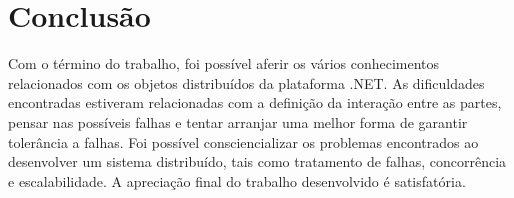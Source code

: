 \chapter{Conclusão} \label{conclusao}

Com o término do trabalho, foi possível aferir os vários conhecimentos relacionados com os objetos distribuídos da plataforma .NET.
As dificuldades encontradas estiveram relacionadas com a definição da interação entre as partes, pensar nas possíveis falhas e tentar arranjar uma melhor forma de garantir tolerância a falhas. Foi possível consciencializar os problemas encontrados ao desenvolver um sistema distribuído, tais como tratamento de falhas, concorrência e escalabilidade.
A apreciação final do trabalho desenvolvido é satisfatória.
